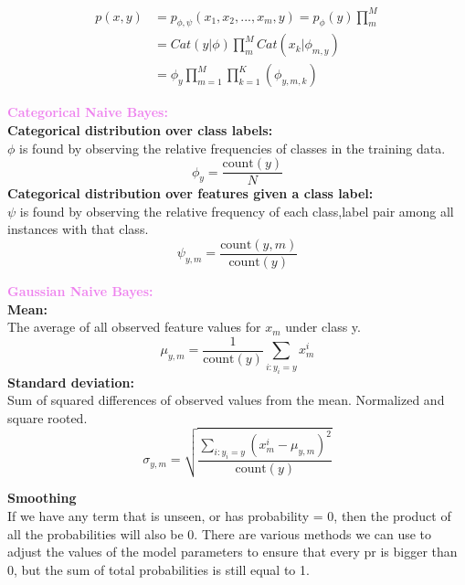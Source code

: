 \documentclass[a4paper,10pt]{article}
\begin{document}
\begin{align*}
	p(x,y) &= p_{\phi, \psi}(x_{1}, x_{2}, ..., x_{m}, y) = p_{\phi}(y)\prod_{m}^{M} \\
	&= Cat(y|\phi)\prod_{m}^{M}Cat(x_{k}|\phi_{m,y}) \\
	&= \phi_{y}\prod_{m=1}^{M}\prod_{k=1}^{K}(\phi_{y,m,k})
\end{align*}
\newpage
\begin{shaded}
	\noindent \textcolor{Violet}{\textbf{Categorical Naive Bayes:}}\\
	\textbf{Categorical distribution over class labels:} \\
	$\phi$ is found by observing the relative frequencies of classes in the training data. 
	\begin{equation*}
		\phi_{y} = \frac{\text{count}(y)}{N}
	\end{equation*}
	\textbf{Categorical distribution over features given a class label:} \\
	 $\psi$ is found by observing the relative frequency of each class,label pair among all instances with that class. 
	\begin{equation*}
		\psi_{y,m} = \frac{\text{count}(y,m)}{\text{count}(y)}
	\end{equation*}
\end{shaded}
\begin{shaded}
	\noindent \textcolor{Violet}{\textbf{Gaussian Naive Bayes:}}\\
	\textbf{Mean:} \\
	The average of all observed feature values for $x_{m}$ under class y. 
	\begin{equation*}
		\mu_{y,m} = \frac{1}{\text{count}(y)}\sum_{i:y_{i}=y}x_{m}^{i}
	\end{equation*}
	\textbf{Standard deviation:} \\
	Sum of squared differences of observed values from the mean. Normalized and square rooted. 
	\begin{equation*}
		\sigma_{y,m} = \sqrt{\frac{\sum_{i:y_{i}=y}(x_{m}^{i} - \mu_{y,m})^{2}}{\text{count}(y)}}
	\end{equation*}
\end{shaded}
\noindent \textcolor{Periwinkle}{\textbf{Smoothing}}\\
If we have any term that is unseen, or has probability = 0, then the product of all the probabilities will also be 0. There are various methods we can use to adjust the values of the model parameters to ensure that every pr is bigger than 0, but the sum of total probabilities is still equal to 1. 
\end{document}
